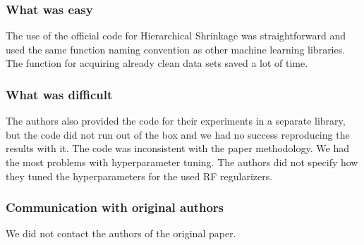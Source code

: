 \subsubsection*{What was easy}


The use of the official code for Hierarchical Shrinkage was straightforward and used the same function naming convention as other machine learning libraries. The function for acquiring already clean data sets saved a lot of time.

\subsubsection*{What was difficult}


The authors also provided the code for their experiments in a separate library, but the code did not run out of the box and we had no success reproducing the results with it. The code was inconsistent with the paper methodology. We had the most problems with hyperparameter tuning. The authors did not specify how they tuned the hyperparameters for the used RF regularizers.

\subsubsection*{Communication with original authors}


We did not contact the authors of the original paper.